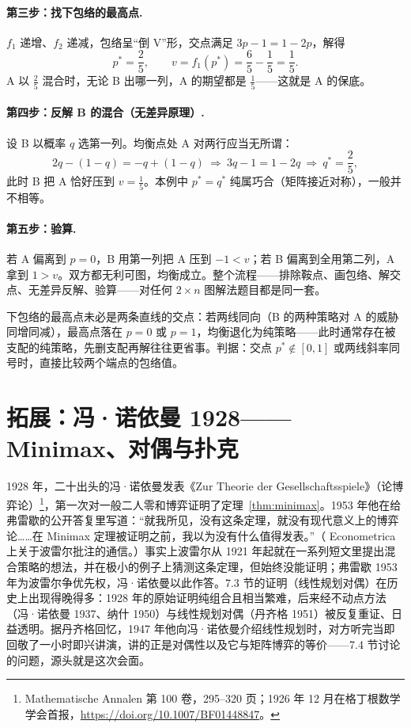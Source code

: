 \documentclass[UTF8,a4paper,11pt,oneside,openany,fontset=fandol]{ctexbook}
\theoremstyle{definition}
\begin{document}
\paragraph{第三步：找下包络的最高点.} $f_1$ 递增、$f_2$ 递减，包络呈“倒 V”形，交点满足 $3p-1=1-2p$，解得
\[
 p^{*}=\frac25,\qquad v=f_1(p^{*})=\frac65-\frac15=\frac15 .
\]
A 以 $\tfrac25$ 混合时，无论 B 出哪一列，A 的期望都是 $\tfrac15$——这就是 A 的保底。

\paragraph{第四步：反解 B 的混合（无差异原理）.} 设 B 以概率 $q$ 选第一列。均衡点处 A 对两行应当无所谓：
\[
 2q-(1-q)=-q+(1-q)\ \Longrightarrow\ 3q-1=1-2q\ \Longrightarrow\ q^{*}=\frac25,
\]
此时 B 把 A 恰好压到 $v=\tfrac15$。本例中 $p^{*}=q^{*}$ 纯属巧合（矩阵接近对称），一般并不相等。

\paragraph{第五步：验算.} 若 A 偏离到 $p=0$，B 用第一列把 A 压到 $-1<v$；若 B 偏离到全用第二列，A 拿到 $1>v$。双方都无利可图，均衡成立。整个流程——排除鞍点、画包络、解交点、无差异反解、验算——对任何 $2\times n$ 图解法题目都是同一套。

\begin{pitfall}
下包络的最高点未必是两条直线的交点：若两线同向（B 的两种策略对 A 的威胁同增同减），最高点落在 $p=0$ 或 $p=1$，均衡退化为纯策略——此时通常存在被支配的纯策略，先删支配再解往往更省事。判据：交点 $p^{*}\notin[0,1]$ 或两线斜率同号时，直接比较两个端点的包络值。
\end{pitfall}

\section{拓展：冯·诺依曼 1928——Minimax、对偶与扑克}
1928 年，二十出头的冯·诺依曼发表《Zur Theorie der Gesellschaftsspiele》（论博弈论）\footnote{Mathematische Annalen 第 100 卷，295--320 页；1926 年 12 月在格丁根数学学会首报，\url{https://doi.org/10.1007/BF01448847}。}，第一次对一般二人零和博弈证明了定理~\ref{thm:minimax}。1953 年他在给弗雷歇的公开答复里写道：“就我所见，没有这条定理，就没有现代意义上的博弈论……在 Minimax 定理被证明之前，我以为没有什么值得发表。”（ Econometrica 上关于波雷尔批注的通信。）事实上波雷尔从 1921 年起就在一系列短文里提出混合策略的想法，并在极小的例子上猜测这条定理，但始终没能证明；弗雷歇 1953 年为波雷尔争优先权，冯·诺依曼以此作答。7.3 节的证明（线性规划对偶）在历史上出现得晚得多：1928 年的原始证明纯组合且相当繁难，后来经不动点方法（冯·诺依曼 1937、纳什 1950）与线性规划对偶（丹齐格 1951）被反复重证、日益透明。据丹齐格回忆，1947 年他向冯·诺依曼介绍线性规划时，对方听完当即回敬了一小时即兴讲演，讲的正是对偶性以及它与矩阵博弈的等价——7.4 节讨论的问题，源头就是这次会面。
\end{document}
